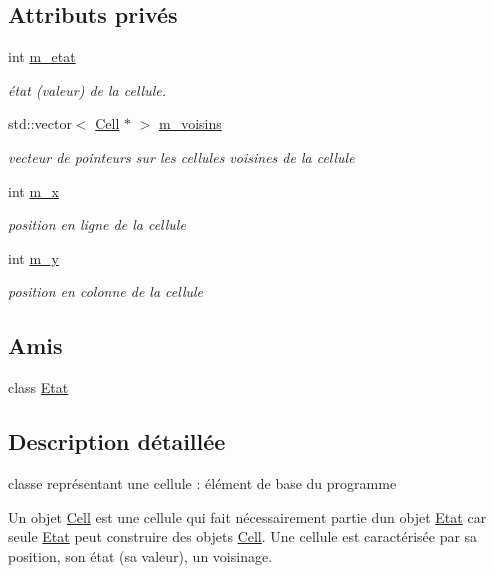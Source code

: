 \subsection*{Attributs privés}
\begin{DoxyCompactItemize}
\item 
int \mbox{\hyperlink{class_cell_a350cfee41db7450651de4e48543227c3}{m\+\_\+etat}}
\begin{DoxyCompactList}\small\item\em état (valeur) de la cellule. \end{DoxyCompactList}\item 
std\+::vector$<$ \mbox{\hyperlink{class_cell}{Cell}} $\ast$ $>$ \mbox{\hyperlink{class_cell_a7d781cbf0f2a5dffd13313b8eab86732}{m\+\_\+voisins}}
\begin{DoxyCompactList}\small\item\em vecteur de pointeurs sur les cellules voisines de la cellule \end{DoxyCompactList}\item 
int \mbox{\hyperlink{class_cell_ae38c546e6fd703965c8b62f750e68417}{m\+\_\+x}}
\begin{DoxyCompactList}\small\item\em position en ligne de la cellule \end{DoxyCompactList}\item 
int \mbox{\hyperlink{class_cell_a303c301e529e95ce1eadaf5b73ad41b2}{m\+\_\+y}}
\begin{DoxyCompactList}\small\item\em position en colonne de la cellule \end{DoxyCompactList}\end{DoxyCompactItemize}
\subsection*{Amis}
\begin{DoxyCompactItemize}
\item 
class \mbox{\hyperlink{class_cell_af495e82aa15594b628d4192e8ecb688b}{Etat}}
\end{DoxyCompactItemize}


\subsection{Description détaillée}
classe représentant une cellule \+: élément de base du programme 

Un objet \mbox{\hyperlink{class_cell}{Cell}} est une cellule qui fait nécessairement partie d\textquotesingle{}un objet \mbox{\hyperlink{class_etat}{Etat}} car seule \mbox{\hyperlink{class_etat}{Etat}} peut construire des objets \mbox{\hyperlink{class_cell}{Cell}}. Une cellule est caractérisée par sa position, son état (sa valeur), un voisinage. 

